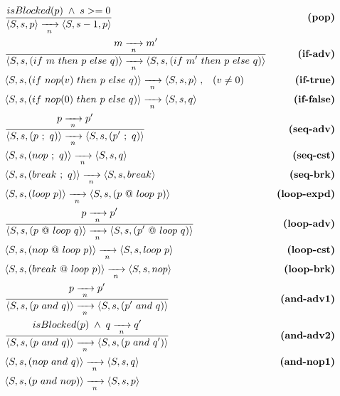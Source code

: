 \begin{eqnarray*}
& \frac
    {\DS isBlocked(p) \1\wedge\1 s>=0 }
    {\DS \LL S,s, p \RR \ST \LL S,s-1,p \RR }
    & \textbf{(pop)}       \\
& \frac
    {\DS m \ST m' }
    {\DS \LL S,s, (if~m~then~p~else~q) \RR \ST
         \LL S,s, (if~m'~then~p~else~q)\RR }
    & \textbf{(if-adv)}       \\
& \LL S,s, (if~nop(v)~then~p~else~q) \RR \ST
  \LL S,s,  p \RR \1,\3 (v \neq 0)
    & \textbf{(if-true)}       \\
& \LL S,s, (if~nop(0)~then~p~else~q) \RR \ST
  \LL S,s, q \RR
    & \textbf{(if-false)}       \\
& \frac
    {\DS p \ST p' }
    {\DS \LL S,s, (p~;~q) \RR \ST \LL S,s, (p'~;~q) \RR }
    & \textbf{(seq-adv)}      \\
& \LL S,s, (nop~;~q) \RR \ST  \LL S,s, q \RR
    & \textbf{(seq-cst)}      \\
& \LL S,s, (break~;~q) \RR \ST \LL S,s, break \RR
    & \textbf{(seq-brk)}      \\
& \LL S,s, (loop~p) \RR \ST \LL S,s, (p~@~loop~p) \RR
    & \textbf{(loop-expd)}       \\
& \frac
    {\DS p \ST p' }
    {\DS \LL S,s, (p~@~loop~q) \RR \ST \LL S,s, (p'~@~loop~q) \RR }
    & \textbf{(loop-adv)}    \\
& \LL S,s, (nop~@~loop~p) \RR \ST \LL S,s, loop~p \RR
    & \textbf{(loop-cst)}    \\
& \LL S,s, (break~@~loop~p) \RR \ST \LL S,s, nop \RR
    & \textbf{(loop-brk)}    \\
& \frac
    {\DS p \ST p' }
    {\DS \LL S,s, (p~and~q) \RR \ST \LL S,s, (p'~and~q) \RR }
    & \textbf{(and-adv1)}      \\
& \frac
    {\DS isBlocked(p) \1\wedge\1 q \ST q' }
    {\DS \LL S,s, (p~and~q) \RR \ST \LL S,s, (p~and~q') \RR }
    & \textbf{(and-adv2)}      \\
& \LL S,s, (nop~and~q) \RR \ST \LL S,s, q \RR
    & \textbf{(and-nop1)}   \\
& \LL S,s, (p~and~nop) \RR \ST \LL S,s, p \RR

\end{eqnarray*}

